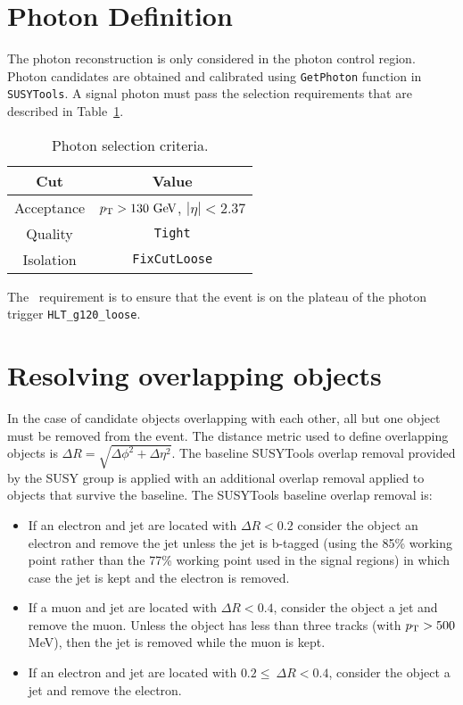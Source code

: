 \section{Photon Definition}
\label{sec:PhoDef}
The photon reconstruction is only considered in the photon control region. Photon candidates are obtained and calibrated using {\tt GetPhoton} function in {\tt SUSYTools}. A signal photon must pass the selection requirements that are described in Table~\ref{tb:photons}.


\begin{table}[htp]
  \caption{Photon selection criteria.} 
  \begin{center}
    \begin{tabular}{c|c} \hline \hline
      Cut & Value \\ \hline \hline
      Acceptance & $\pT > 130 \gev$, $|\eta| < 2.37$ \\ \hline
      Quality & {\tt Tight} \\ \hline
      Isolation &  {\tt FixCutLoose} \\ \hline
      \hline
    \end{tabular}
  \end{center}
  \label{tb:photons}
\end{table}%

The \pt\ requirement is to ensure that the event is on the plateau of the photon trigger {\tt HLT\_g120\_loose}.

\section{Resolving overlapping objects}
\label{sec:Selection_overlap}

In the case of candidate objects overlapping with each other, all but one object must be removed from the event. The distance metric used to define overlapping objects is $\Delta R = \sqrt{\Delta \phi^2 + \Delta \eta^2}$. The baseline SUSYTools overlap removal provided by the SUSY group is applied with an additional overlap removal applied to objects that survive the baseline. The SUSYTools baseline overlap removal is: \\

\begin{itemize}
\item If an electron and jet are located with $\Delta R < 0.2$ consider the object an electron and remove the jet unless the jet is b-tagged (using the 85\% working point rather than the 77\% working point used in the signal regions) in which case the jet is kept and the electron is removed. 
\item If a muon and jet are located with $\Delta R < 0.4$, consider the object a jet and remove the muon. Unless the object has less than three tracks (with $p_{\mathrm{T}}>500$ MeV), then the jet is removed while the muon is kept. 
\item If an electron and jet are located with $0.2 \leq\ \Delta R < 0.4$, consider the object a jet and remove the electron.
\end{itemize}


